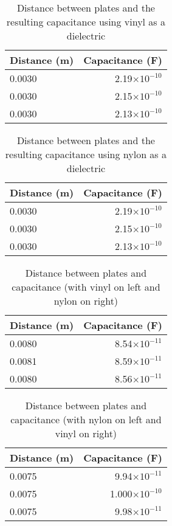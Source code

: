 \documentclass [12pt, letterpaper, twoside] {article}
\begin{document}
\begin{table}
  \centering
  \begin{tabular}{| l | r |}
    \hline\hline
    Distance (m) & Capacitance (F) \\
    \hline
    0.0030 & 2.19\(\times10^{-10}\) \\
    \hline
    0.0030 & 2.15\(\times10^{-10}\) \\
    \hline
    0.0030 & 2.13\(\times10^{-10}\) \\
    \hline\hline
  \end{tabular}
  \caption{Distance between plates and the resulting capacitance using vinyl as a dielectric}
\end{table}

\begin{table}
  \centering
  \begin{tabular}{| l | r |}
    \hline\hline
    Distance (m) & Capacitance (F) \\
    \hline
    0.0030 & 2.19\(\times10^{-10}\) \\
    \hline
    0.0030 & 2.15\(\times10^{-10}\) \\
    \hline
    0.0030 & 2.13\(\times10^{-10}\) \\
    \hline\hline
  \end{tabular}
  \caption{Distance between plates and the resulting capacitance using nylon as a dielectric}
\end{table}

\begin{table}
  \centering
  \begin{tabular}{| l | r |}
    \hline\hline
    Distance (m) & Capacitance (F) \\
    \hline
    0.0080 & 8.54\(\times10^{-11}\) \\
    \hline
    0.0081 & 8.59\(\times10^{-11}\) \\
    \hline
    0.0080 & 8.56\(\times10^{-11}\) \\  
    \hline\hline
  \end{tabular}
  \caption{Distance between plates and capacitance (with vinyl on left and nylon on right)}
\end{table}

\begin{table}
  \centering
  \begin{tabular}{| l | r |}
    \hline\hline
    Distance (m) & Capacitance (F) \\
    \hline
    0.0075 & 9.94\(\times10^{-11}\) \\
    \hline
    0.0075 & 1.000\(\times10^{-10}\) \\
    \hline
    0.0075 & 9.98\(\times10^{-11}\) \\  
    \hline\hline
  \end{tabular}
  \caption{Distance between plates and capacitance (with nylon on left and vinyl on right)}
\end{table}
\end{document}

